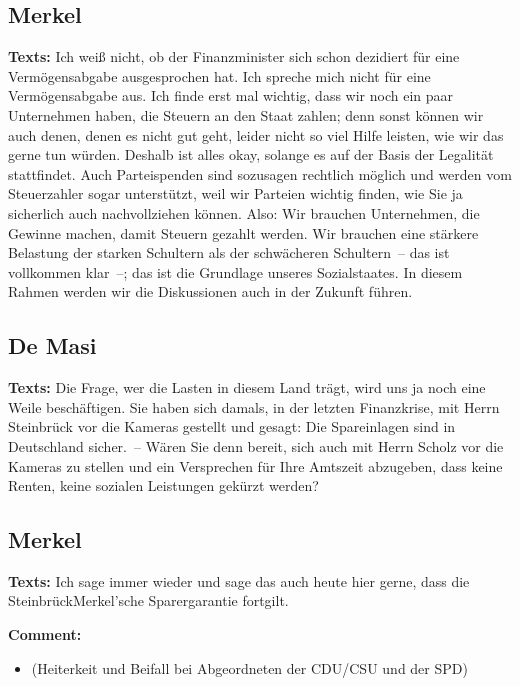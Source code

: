 \documentclass{article}
\begin{document}
\subsection{Merkel}
\noindent\textbf{Texts:} Ich weiß nicht, ob der Finanzminister sich schon dezidiert für eine Vermögensabgabe ausgesprochen hat. Ich spreche mich nicht für eine Vermögensabgabe aus. Ich finde erst mal wichtig, dass wir noch ein paar Unternehmen haben, die Steuern an den Staat zahlen; denn sonst können wir auch denen, denen es nicht gut geht, leider nicht so viel Hilfe leisten, wie wir das gerne tun würden. Deshalb ist alles okay, solange es auf der Basis der Legalität stattfindet. Auch Parteispenden sind sozusagen rechtlich möglich und werden vom Steuerzahler sogar unterstützt, weil wir Parteien wichtig finden, wie Sie ja sicherlich auch nachvollziehen können. Also: Wir brauchen Unternehmen, die Gewinne machen, damit Steuern gezahlt werden. Wir brauchen eine stärkere Belastung der starken Schultern als der schwächeren Schultern – das ist vollkommen klar –; das ist die Grundlage unseres Sozialstaates. In diesem Rahmen werden wir die Diskussionen auch in der Zukunft führen.

\subsection{De Masi}
\noindent\textbf{Texts:} Die Frage, wer die Lasten in diesem Land trägt, wird uns ja noch eine Weile beschäftigen. Sie haben sich damals, in der letzten Finanzkrise, mit Herrn Steinbrück vor die Kameras gestellt und gesagt: Die Spareinlagen sind in Deutschland sicher. – Wären Sie denn bereit, sich auch mit Herrn Scholz vor die Kameras zu stellen und ein Versprechen für Ihre Amtszeit abzugeben, dass keine Renten, keine sozialen Leistungen gekürzt werden?

\subsection{Merkel}
\noindent\textbf{Texts:} Ich sage immer wieder und sage das auch heute hier gerne, dass die Steinbrück\/Merkel’sche Sparergarantie fortgilt. 

\noindent\textbf{Comment:}
\begin{itemize}
    \setlength\itemsep{-3pt}
    \item (Heiterkeit und Beifall bei Abgeordneten der CDU/CSU und der SPD)
\end{itemize}
\end{document}

